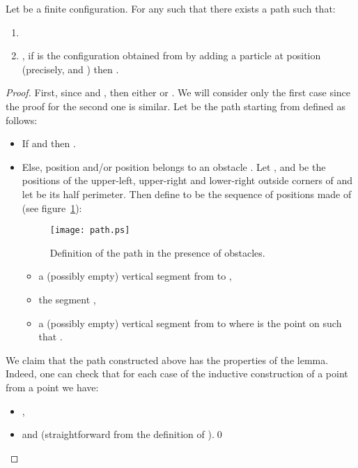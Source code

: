 \documentclass{llncs}
\begin{document}
\begin{lemma}
  \label{lem:partattack}
  Let  be a finite
  configuration. For any  such that  there exists
  a path  such that:
  \begin{enumerate}
  \item 
  \item , if  is the
    configuration obtained from  by adding a particle at position
     (precisely,  and
    ) then
    .
  \end{enumerate}
\end{lemma}
\begin{proof}
  First, since  and , then either
   or . We
  will consider only the first case since the proof for the second one
  is similar. Let  be the path starting from  defined as
  follows:
  \begin{itemize}
  \item If  and  then .
  \item Else, position  and/or position 
    belongs to an obstacle .  Let ,  and  be the positions
    of the upper-left, upper-right and lower-right outside corners of
     and let  be its half perimeter. Then define
     to be the sequence of positions made
    of (see figure~\ref{fig:thepath}):

    \begin{figure}
      \centering
      \texttt{[image: path.ps]}
      \caption{Definition of the  path in the presence of obstacles.}
      \label{fig:thepath}
    \end{figure}
    \begin{itemize}
    \item a (possibly empty) vertical segment from  to ,
    \item the segment ,
    \item a (possibly empty) vertical segment from  to 
      where  is the point on  such that .
    \end{itemize}
  \end{itemize}
  We claim that the path  constructed above has the properties
  of the lemma. Indeed, one can check that for each case of the
  inductive construction of a point  from a point  we have:
  \begin{itemize}
  \item ,
  \item  and
     (straightforward from
    the definition of ).\qed
  \end{itemize}
\end{proof}
\end{document}
